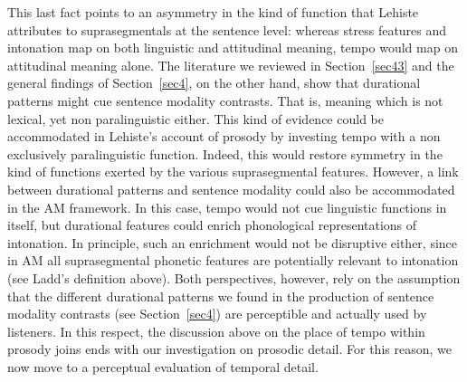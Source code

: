 \fussy
This last fact points to an asymmetry in the kind of function that Lehiste attributes to suprasegmentals at the sentence level: whereas stress features and intonation map on both linguistic and attitudinal meaning, tempo would map on attitudinal meaning alone.
The literature we reviewed in Section~\ref{sec43} and the general findings of Section~\ref{sec4}, on the other hand, show that durational patterns might cue sentence modality contrasts. That is, meaning which is not lexical, yet non paralinguistic either. This kind of evidence could be accommodated in Lehiste's account of prosody by investing tempo with a non exclusively paralinguistic function. Indeed, this would restore symmetry in the kind of functions exerted by the various suprasegmental features. However, a link between durational patterns and sentence modality could also be accommodated in the AM framework. In this case, tempo would not cue linguistic functions in itself, but durational features could enrich phonological representations of intonation. In principle, such an enrichment would not be disruptive either, since in AM all suprasegmental phonetic features are potentially relevant to intonation (see Ladd's definition above).
Both perspectives, however, rely on the assumption that the different durational patterns we found in the production of sentence modality contrasts (see Section~\ref{sec4}) are perceptible and actually used by listeners. In this respect, the discussion above on the place of tempo within prosody joins ends with our investigation on prosodic detail. For this reason, we now move to a perceptual evaluation of temporal detail.
